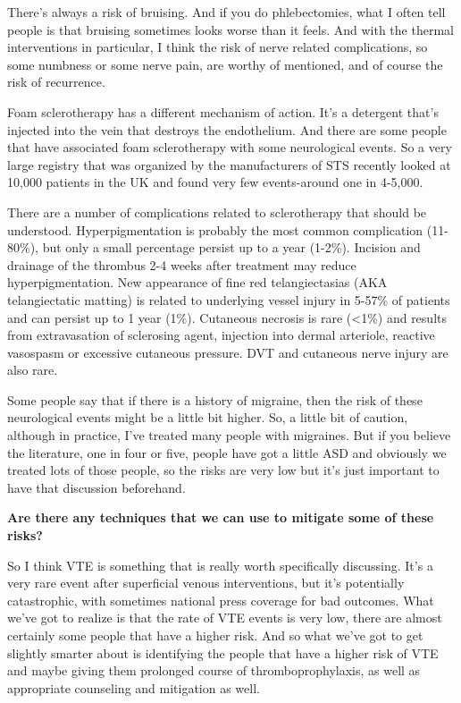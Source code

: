 \documentclass[
]{book}
\begin{document}
There's always a risk of bruising. And if you do phlebectomies, what I
often tell people is that bruising sometimes looks worse than it feels.
And with the thermal interventions in particular, I think the risk of
nerve related complications, so some numbness or some nerve pain, are
worthy of mentioned, and of course the risk of recurrence.

Foam sclerotherapy has a different mechanism of action. It's a detergent
that's injected into the vein that destroys the endothelium. And there
are some people that have associated foam sclerotherapy with some
neurological events. So a very large registry that was organized by the
manufacturers of STS recently looked at 10,000 patients in the UK and
found very few events-around one in 4-5,000.

There are a number of complications related to sclerotherapy that should
be understood. Hyperpigmentation is probably the most common
complication (11-80\%), but only a small percentage persist up to a year
(1-2\%). Incision and drainage of the thrombus 2-4 weeks after treatment
may reduce hyperpigmentation. New appearance of fine red telangiectasias
(AKA telangiectatic matting) is related to underlying vessel injury in
5-57\% of patients and can persist up to 1 year (1\%). Cutaneous necrosis
is rare (\textless1\%) and results from extravasation of sclerosing agent,
injection into dermal arteriole, reactive vasospasm or excessive
cutaneous pressure. DVT and cutaneous nerve injury are also
rare.\citep{bergan2006, munavalli2007}

Some people say that if there is a history of migraine, then the risk of
these neurological events might be a little bit higher. So, a little bit
of caution, although in practice, I've treated many people with
migraines. But if you believe the literature, one in four or five,
people have got a little ASD and obviously we treated lots of those
people, so the risks are very low but it's just important to have that
discussion beforehand.

\textbf{Are there any techniques that we can use to mitigate some of these
risks?}

So I think VTE is something that is really worth specifically
discussing. It's a very rare event after superficial venous
interventions, but it's potentially catastrophic, with sometimes
national press coverage for bad outcomes. What we've got to realize is
that the rate of VTE events is very low, there are almost certainly some
people that have a higher risk. And so what we've got to get slightly
smarter about is identifying the people that have a higher risk of VTE
and maybe giving them prolonged course of thromboprophylaxis, as well as
appropriate counseling and mitigation as well.
\end{document}
